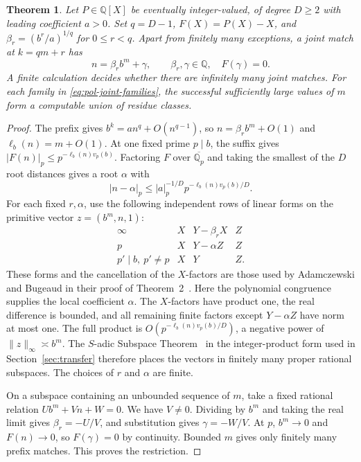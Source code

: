 \documentclass[11pt,reqno,a4paper]{amsart}
\newtheorem{theorem}{Theorem}[section]
\theoremstyle{remark}
\begin{document}
\begin{theorem}\label{thm:pol-joint}
Let \(P\in\mathbb Q[X]\) be eventually integer-valued, of
degree \(D\ge2\) with leading coefficient \(a>0\). Set \(q=D-1\),
\(F(X)=P(X)-X\), and \(\beta_r=(b^r/a)^{1/q}\) for
\(0\le r<q\). Apart from finitely many exceptions, a joint
match at \(k=qm+r\) has
\begin{equation}\label{eq:pol-joint-families}
 n=\beta_r b^m+\gamma,\qquad
 \beta_r,\gamma\in\mathbb Q,\quad F(\gamma)=0.
\end{equation}
A finite calculation decides whether there are infinitely
many joint matches. For each family in
\eqref{eq:pol-joint-families}, the successful sufficiently large
values of \(m\) form a computable union of residue classes.
\end{theorem}
\begin{proof}
The prefix gives \(b^k=a n^q+O(n^{q-1})\), so
\(n=\beta_r b^m+O(1)\) and \(\ell_b(n)=m+O(1)\).
At one fixed prime \(p\mid b\), the suffix gives
\(|F(n)|_p\le p^{-\ell_b(n)v_p(b)}\). Factoring \(F\) over
\(\overline{\mathbb Q_p}\) and taking the smallest of the
\(D\) root distances gives a root \(\alpha\) with
\[
 |n-\alpha|_p\le |a|_p^{-1/D}p^{-\ell_b(n)v_p(b)/D}.
\]
For each fixed \(r,\alpha\), use the following independent
rows of linear forms on the primitive vector \(z=(b^m,n,1)\):
\[
 \begin{array}{c|ccc}
  \infty & X & Y-\beta_r X & Z\\
  p & X & Y-\alpha Z & Z\\
  p'\mid b,\ p'\ne p & X & Y & Z .
 \end{array}
\]
These forms and the cancellation of the \(X\)-factors are
those used by Adamczewski and Bugeaud in their proof of
Theorem~2~\cite[\S5]{pol-sym}. Here the polynomial congruence
supplies the local coefficient \(\alpha\). The \(X\)-factors
have product one, the real difference is bounded, and all
remaining finite factors except \(Y-\alpha Z\) have norm at
most one. The full product is \(O(p^{-\ell_b(n)v_p(b)/D})\),
a negative power of \(\|z\|_\infty\asymp b^m\).
The \(S\)-adic Subspace Theorem~\cite{schlickewei}
in the integer-product form used in Section~\ref{sec:transfer}
therefore places the vectors in finitely many proper rational
subspaces. The choices of \(r\) and \(\alpha\) are finite.

On a subspace containing an unbounded sequence of \(m\),
take a fixed rational relation \(U b^m+V n+W=0\). We have
\(V\ne0\). Dividing by \(b^m\) and taking the real limit
gives \(\beta_r=-U/V\), and substitution gives
\(\gamma=-W/V\). At \(p\), \(b^m\to0\) and \(F(n)\to0\),
so \(F(\gamma)=0\) by continuity. Bounded \(m\) gives
only finitely many prefix matches. This proves the restriction.


\end{proof}
\end{document}
